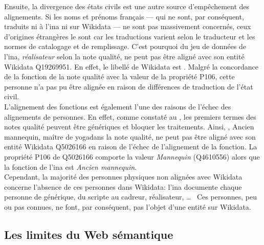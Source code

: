 Ensuite, la divergence des états civils est une autre source d'empêchement des alignements. Si les noms et prénoms français --- qui ne sont, par conséquent, traduits ni à l'\ac{ina} ni sur Wikidata --- ne sont pas massivement concernés, ceux d'origines étrangères le sont car les traductions varient selon le traducteur et les normes de catalogage et de remplissage. C'est pourquoi  du jeu de données de l'\ac{ina}, \textit{réalisateur} selon la note qualité, ne peut pas être aligné avec son entité Wikidata Q19269951. En effet, le libellé de Wikidata est . Malgré la concordance de la fonction de la note qualité avec la valeur de la propriété P106, cette personne n'a pas pu être alignée en raison de différences de traduction de l'état civil.\\

L'alignement des fonctions est également l'une des raisons de l'échec des alignements de personnes. En effet, comme constaté au , les premiers termes des notes qualité peuvent être génériques et bloquer les traitements. Ainsi, , \og Ancien mannequin, maître de yoga\fg dans la note qualité, ne peut pas être aligné avec son entité Wikidata Q5026166 en raison de l'échec de l'alignement de la fonction. La propriété P106 de Q5026166 comporte la valeur \textit{Mannequin} (Q4610556) alors que la fonction de l'\ac{ina} est \textit{Ancien mannequin}.\\

Cependant, la majorité des personnes physiques non alignées avec Wikidata concerne l'absence de ces personnes dans Wikidata: l'\ac{ina} documente chaque personne de générique, du scripte au cadreur, réalisateur, \dots~ Ces personnes, peu ou pas connues, ne font, par conséquent, pas l'objet d'une entité sur Wikidata.

\subsection{\label{II-C-4-b}Les limites du Web sémantique}

